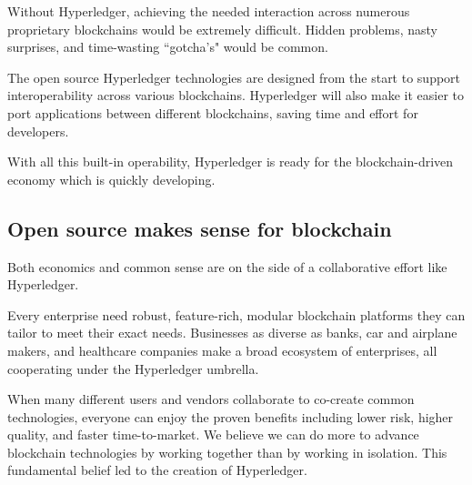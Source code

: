 Without Hyperledger, achieving the needed interaction across numerous proprietary blockchains would be extremely difficult. 
Hidden problems, nasty surprises, and time-wasting ``gotcha's" would be common. 

The open source Hyperledger technologies are designed from the start to support interoperability across various blockchains. 
Hyperledger will also make it easier to port applications between different blockchains, saving time and effort for developers. 

With all this built-in operability, Hyperledger is ready for the blockchain-driven economy which is quickly developing. 

\subsection{Open source makes sense for blockchain}
Both economics and common sense are on the side of a collaborative effort like Hyperledger. 

Every enterprise need robust, feature-rich, modular blockchain platforms they can tailor to meet their exact needs. 
Businesses as diverse as banks, car and airplane makers, and healthcare companies make a broad ecosystem of enterprises, all cooperating under the Hyperledger umbrella.

When many different users and vendors collaborate to co-create common technologies, everyone can enjoy the proven benefits including lower risk, higher quality, and faster time-to-market. 
We believe we can do more to advance blockchain technologies by working together than by working in isolation. 
This fundamental belief led to the creation of Hyperledger. 
